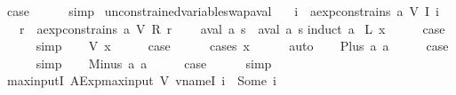 \begin{isabellebody}
\ {\isacharquery}case\isanewline
\ \ \ \ \isamarkupfalse%
\ simp\isanewline
{}\isamarkupfalse%
%
\endisatagproof
{\isafoldproof}%
%
\isadelimproof
\isanewline
%
\endisadelimproof
\isanewline
{}\isamarkupfalse%
\ unconstrained{\isacharunderscore}variable{\isacharunderscore}swap{\isacharunderscore}aval{\isacharcolon}\ \isanewline
\ \ {\isachardoublequoteopen}{\isasymforall}i{\isachardot}\ {\isasymnot}\ aexp{\isacharunderscore}constrains\ a\ {\isacharparenleft}V\ {\isacharparenleft}I\ i{\isacharparenright}{\isacharparenright}\ {\isasymLongrightarrow}\isanewline
\ \ \ {\isasymforall}r{\isachardot}\ {\isasymnot}\ aexp{\isacharunderscore}constrains\ a\ {\isacharparenleft}V\ {\isacharparenleft}R\ r{\isacharparenright}{\isacharparenright}\ {\isasymLongrightarrow}\isanewline
\ \ \ aval\ a\ s\ {\isacharequal}\ aval\ a\ s{\isacharprime}{\isachardoublequoteclose}\isanewline
%
\isadelimproof
%
\endisadelimproof
%
\isatagproof
{}\isamarkupfalse%
{\isacharparenleft}induct\ a{\isacharparenright}\isanewline
{}\isamarkupfalse%
\ {\isacharparenleft}L\ x{\isacharparenright}\isanewline
\ \ \isamarkupfalse%
\ \isamarkupfalse%
\ {\isacharquery}case\isanewline
\ \ \ \ \isamarkupfalse%
\ simp\isanewline
{}\isamarkupfalse%
\isanewline
\ \ \isamarkupfalse%
\ {\isacharparenleft}V\ x{\isacharparenright}\isanewline
\ \ \isamarkupfalse%
\ \isamarkupfalse%
\ {\isacharquery}case\isanewline
\ \ \ \ \isamarkupfalse%
\ {\isacharparenleft}cases\ x{\isacharparenright}\isanewline
\ \ \ \ \isamarkupfalse%
\ auto\isanewline
{}\isamarkupfalse%
\isanewline
\ \ \isamarkupfalse%
\ {\isacharparenleft}Plus\ a{}\ a{}{\isacharparenright}\isanewline
\ \ \isamarkupfalse%
\ \isamarkupfalse%
\ {\isacharquery}case\isanewline
\ \ \ \ \isamarkupfalse%
\ simp\isanewline
{}\isamarkupfalse%
\isanewline
\ \ \isamarkupfalse%
\ {\isacharparenleft}Minus\ a{}\ a{}{\isacharparenright}\isanewline
\ \ \isamarkupfalse%
\ \isamarkupfalse%
\ {\isacharquery}case\isanewline
\ \ \ \ \isamarkupfalse%
\ simp\isanewline
{}\isamarkupfalse%
%
\endisatagproof
{\isafoldproof}%
%
\isadelimproof
\isanewline
%
\endisadelimproof
\isanewline
{}\isamarkupfalse%
\ max{\isacharunderscore}input{\isacharunderscore}I{\isacharcolon}\ {\isachardoublequoteopen}AExp{\isachardot}max{\isacharunderscore}input\ {\isacharparenleft}V\ {\isacharparenleft}vname{\isachardot}I\ i{\isacharparenright}{\isacharparenright}\ {\isacharequal}\ Some\ i{\isachardoublequoteclose}\isanewline

\end{isabellebody}
